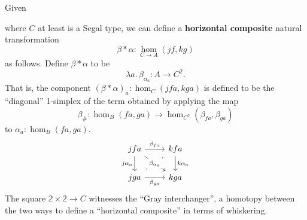 \documentclass{amsart}
\theoremstyle{plain}
\theoremstyle{definition}
\theoremstyle{remark}
\numberwithin{equation}{section}
\newcommand{\extfn}[1]{{#1}_\#}
\def\nat#1#2{\underset{#1\to#2}{\hom}}
\newcommand{\lam}[1]{\lambda #1.\,}
\newcommand{\two}{\mathbb{2}}
\begin{document}
Given
where $C$ at least is a Segal type, we can define a \textbf{horizontal composite} natural transformation
\[
\beta\ast\alpha :\nat CA(jf,kg)
\]
as follows. Define $\beta\ast\alpha$ to be
\[
\lam{a}\beta_{\alpha_a} : A \to C^\two.
\]
That is, the component $(\beta\ast\alpha)_a : \hom_C(jfa, kga)$ is defined to be the ``diagonal'' 1-simplex of the term obtained by applying the map
\[ \extfn\beta : \hom_{B}(fa,ga) \to \hom_{C^\two}(\beta_{fa}, \beta_{ga})\] to $\alpha_a : \hom_{B}(fa,ga)$.
\[
\begin{tikzcd}
jfa \arrow[r, "\beta_{fa}"] \arrow[dr, "\beta_{\alpha_a}" description] \arrow[d, "j\alpha_a"'] & kfa \arrow[d, "k\alpha_a"] \\ jga \arrow[r, "\beta_{ga}"']  \arrow[ur, phantom, "\cdot" very near start, "\cdot" very near end]  & kga
\end{tikzcd}
\]
The square $\two \times \two \to C$ witnesses the ``Gray interchanger'', a homotopy between the two ways to define a ``horizontal composite'' in terms of whiskering.
\end{document}
